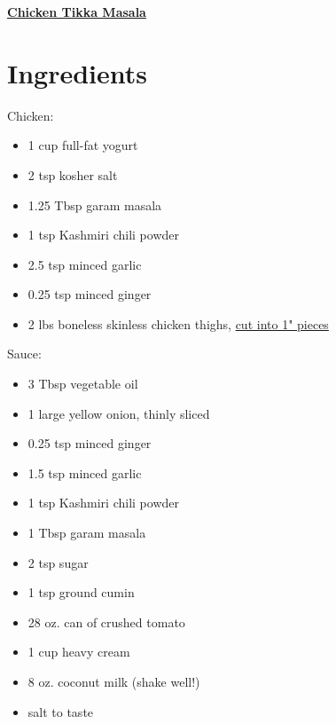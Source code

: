 \documentclass[11pt]{article}
\begin{document}
	\begin{center}\begin{huge}\underline{\textbf{Chicken Tikka Masala}}\end{huge}\end{center}

	\section*{Ingredients}
	Chicken:\vspace*{-1.5ex}
	\begin{itemize}%
		\item 1 cup full-fat yogurt
		\item 2 tsp kosher salt
		\item 1.25 Tbsp garam masala
		\item 1 tsp Kashmiri chili powder
		\item 2.5 tsp minced garlic
		\item 0.25 tsp minced ginger
		\item 2 lbs boneless skinless chicken thighs, \underline{cut into 1" pieces}
	\end{itemize}

	Sauce:\vspace*{-1.5ex}
	\begin{itemize}
		\item 3 Tbsp vegetable oil
		\item 1 large yellow onion, thinly sliced
		\item 0.25 tsp minced ginger
		\item 1.5 tsp minced garlic
		\item 1 tsp Kashmiri chili powder
		\item 1 Tbsp garam masala
		\item 2 tsp sugar
		\item 1 tsp ground cumin
		\item 28 oz. can of crushed tomato
		\item 1 cup heavy cream
		\item 8 oz. coconut milk (shake well!)
		\item salt to taste
	\end{itemize}
\end{document}
